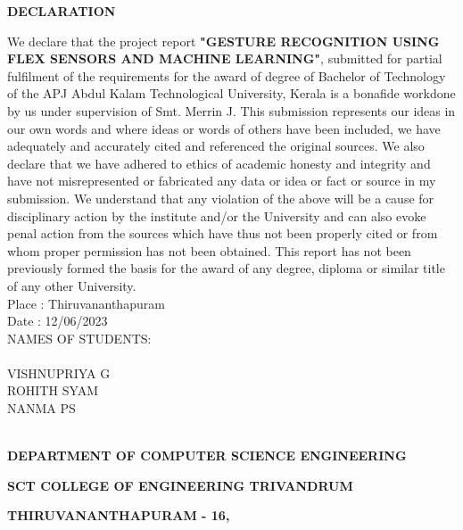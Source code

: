 \documentclass[a4paper,12pt,oneside]{report}
\begin{document}
          \newpage
          \begin{center} {\large \bf DECLARATION}\vspace{0.1cm}\end{center}
We declare that the project report {\large\bf{"GESTURE RECOGNITION USING FLEX SENSORS AND MACHINE LEARNING"}},
submitted for partial fulfilment of the requirements for the award of degree of Bachelor of
Technology of the APJ Abdul Kalam Technological University, Kerala is a bonafide workdone by us under supervision of Smt. Merrin J. This submission represents our ideas in
our own words and where ideas or words of others have been included, we have adequately
and accurately cited and referenced the original sources. We also declare that we have
adhered to ethics of academic honesty and integrity and have not misrepresented or fabricated
any data or idea or fact or source in my submission. We understand that any violation of the
above will be a cause for disciplinary action by the institute and/or the University and can
also evoke penal action from the sources which have thus not been properly cited or from
whom proper permission has not been obtained. This report has not been previously formed
the basis for the award of any degree, diploma or similar title of any other University.
 \vspace{1cm}
 \\Place : Thiruvananthapuram
 \\Date : 12/06/2023
 \\
 \hspace*{10cm}NAMES OF STUDENTS:
         \\
 \\
         \hspace*{10cm} VISHNUPRIYA G
\\
         \hspace*{10cm} ROHITH SYAM
 \\
         \hspace*{10cm} NANMA PS
 \\
 \\
         

         \newpage
         \thispagestyle{empty}
	
 \vspace*{-0.3cm}
 \begin{center} {\large \bf DEPARTMENT OF COMPUTER SCIENCE ENGINEERING}\vspace{0.1cm}\end{center}
 \begin{center} {\large \bf SCT COLLEGE OF ENGINEERING TRIVANDRUM}\vspace{0.1cm}\end{center}
 \begin{center} {\large \bf THIRUVANANTHAPURAM - 16, }\vspace{0.1cm}\end{center}
	
\end{document}
